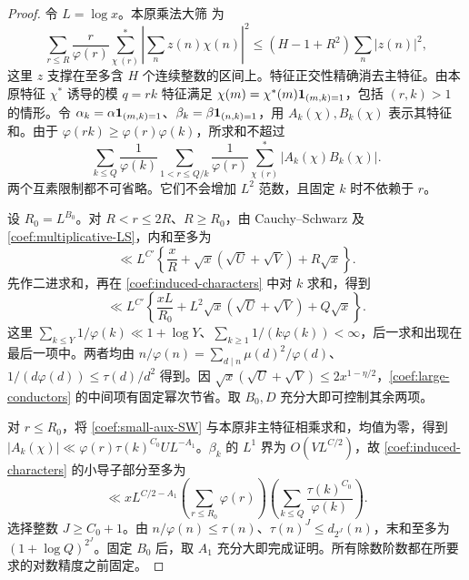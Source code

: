 \begin{proof}
令 $L=\log x$。本原乘法大筛 \cite[定理~18.2]{Kedlaya} 为
\begin{equation}
 \sum_{r\le R}\frac r{\varphi(r)}\sum_{\chi\ (r)}^{*}
 \left|\sum_nz(n)\chi(n)\right|^2
 \le(H-1+R^2)\sum_n|z(n)|^2,
 \label{coef:multiplicative-LS}
\end{equation}
这里 $z$ 支撑在至多含 $H$ 个连续整数的区间上。特征正交性精确消去主特征。由本原特征 $\chi^*$ 诱导的模 $q=rk$ 特征满足 $\chi(m)=\chi^*(m)\mathbf 1_{(m,k)=1}$，包括 $(r,k)>1$ 的情形。令 $\alpha_k=\alpha\mathbf 1_{(m,k)=1}$、$\beta_k=\beta\mathbf 1_{(n,k)=1}$，用 $A_k(\chi),B_k(\chi)$ 表示其特征和。由于 $\varphi(rk)\ge\varphi(r)\varphi(k)$，所求和不超过
\begin{equation}
 \sum_{k\le Q}\frac1{\varphi(k)}
 \sum_{1<r\le Q/k}\frac1{\varphi(r)}
              \sum_{\chi\ (r)}^{*}|A_k(\chi)B_k(\chi)|.
 \label{coef:induced-characters}
\end{equation}
两个互素限制都不可省略。它们不会增加 $L^2$ 范数，且固定 $k$ 时不依赖于 $r$。

设 $R_0=L^{B_0}$。对 $R<r\le2R$、$R\ge R_0$，由 Cauchy--Schwarz 及 \eqref{coef:multiplicative-LS}，内和至多为
\[
 \ll L^{C'}\left\{\frac xR+
 \sqrt x(\sqrt U+\sqrt V)+R\sqrt x\right\}.
\]
先作二进求和，再在 \eqref{coef:induced-characters} 中对 $k$ 求和，得到
\begin{equation}
 \ll L^{C'}\left\{\frac{xL}{R_0}
       +L^2\sqrt x(\sqrt U+\sqrt V)+Q\sqrt x\right\}.
 \label{coef:large-conductors}
\end{equation}
这里 $\sum_{k\le Y}1/\varphi(k)\ll1+\log Y$、$\sum_{k\ge1}1/(k\varphi(k))<\infty$，后一求和出现在最后一项中。两者均由 $n/\varphi(n)=\sum_{d\mid n}\mu(d)^2/\varphi(d)$、$1/(d\varphi(d))\le\tau(d)/d^2$ 得到。因 $\sqrt x(\sqrt U+\sqrt V)\le2x^{1-\eta/2}$，\eqref{coef:large-conductors} 的中间项有固定幂次节省。取 $B_0,D$ 充分大即可控制其余两项。

对 $r\le R_0$，将 \eqref{coef:small-aux-SW} 与本原非主特征相乘求和，均值为零，得到 $|A_k(\chi)|\ll\varphi(r)\tau(k)^{C_0}UL^{-A_1}$。$\beta_k$ 的 $L^1$ 界为 $O(VL^{C/2})$，故 \eqref{coef:induced-characters} 的小导子部分至多为
\[
 \ll xL^{C/2-A_1}
       \left(\sum_{r\le R_0}\varphi(r)\right)
       \left(\sum_{k\le Q}\frac{\tau(k)^{C_0}}{\varphi(k)}\right).
\]
选择整数 $J\ge C_0+1$。由 $n/\varphi(n)\le\tau(n)$、$\tau(n)^J\le d_{2^J}(n)$，末和至多为 $(1+\log Q)^{2^J}$。固定 $B_0$ 后，取 $A_1$ 充分大即完成证明。所有除数阶数都在所要求的对数精度之前固定。
\end{proof}

